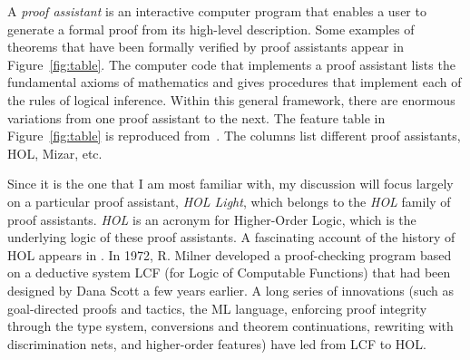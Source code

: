 \documentclass{llncs}
\begin{document}

A {\it proof assistant} is an interactive computer program that
enables a user to generate a formal proof from its high-level
description.  Some examples of theorems that have been formally
verified by proof assistants appear in Figure~\ref{fig:table}.  The
computer code that implements a proof assistant lists the fundamental
axioms of mathematics and gives procedures that implement each of the
rules of logical inference.  Within this general framework, there are
enormous variations from one proof assistant to the next. The feature
table in Figure~\ref{fig:table} is reproduced from~\cite{wiedijk:17}.
The columns list different proof assistants, HOL, Mizar, etc.  

Since it is the one that I am most familiar with, my discussion will
focus largely on a particular proof assistant, {\it HOL Light}, which
belongs to the {\it HOL} family of proof assistants. {\it HOL} is an
acronym for Higher-Order Logic, which is the underlying logic of these
proof assistants.  A fascinating account of the history of HOL appears
in \cite{Gor}.  In 1972, R. Milner developed a proof-checking program
based on a deductive system LCF (for Logic of Computable Functions)
that had been designed by Dana Scott a few years earlier.  A long
series of innovations (such as goal-directed proofs and tactics, the ML
language, enforcing proof integrity through the type system,
conversions and theorem continuations, rewriting with discrimination
nets, and higher-order features) have led from LCF to HOL.
\end{document}

